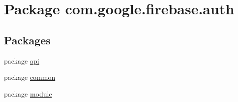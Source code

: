 \hypertarget{namespacecom_1_1google_1_1firebase_1_1auth}{}\section{Package com.\+google.\+firebase.\+auth}
\label{namespacecom_1_1google_1_1firebase_1_1auth}
\subsection*{Packages}
\begin{DoxyCompactItemize}
\item 
package \mbox{\hyperlink{namespacecom_1_1google_1_1firebase_1_1auth_1_1api}{api}}
\item 
package \mbox{\hyperlink{namespacecom_1_1google_1_1firebase_1_1auth_1_1common}{common}}
\item 
package \mbox{\hyperlink{namespacecom_1_1google_1_1firebase_1_1auth_1_1module}{module}}
\end{DoxyCompactItemize}
